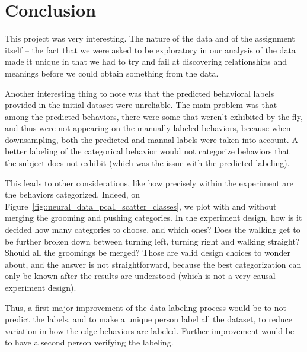 \section{Conclusion}

This project was very interesting.
The nature of the data and of the assignment itself -- the fact that we were asked to be exploratory in our analysis of the data made it unique in that we had to try and fail at discovering relationships and meanings before we could obtain something from the data.

\vspace{\baselineskip}

Another interesting thing to note was that the predicted behavioral labels provided in the initial dataset were unreliable.
The main problem was that among the predicted behaviors, there were some that weren't exhibited by the fly, and thus were not appearing on the manually labeled behaviors, because when downsampling, both the predicted and manual labels were taken into account.
A better labeling of the categorical behavior would not categorize behaviors that the subject does not exhibit (which was the issue with the predicted labeling).

\vspace{\baselineskip}

This leads to other considerations, like how precisely within the experiment are the behaviors categorized.
Indeed, on Figure~\ref{fig::neural_data_pca1_scatter_classes}, we plot with and without merging the grooming and pushing categories.
In the experiment design, how is it decided how many categories to choose, and which ones?
Does the walking get to be further broken down between turning left, turning right and walking straight?
Should all the groomings be merged?
Those are valid design choices to wonder about, and the answer is not straightforward, because the best categorization can only be known after the results are understood (which is not a very causal experiment design).

\vspace{\baselineskip}

Thus, a first major improvement of the data labeling process would be to not predict the labels, and to make a unique person label all the dataset, to reduce variation in how the edge behaviors are labeled.
Further improvement would be to have a second person verifying the labeling.

\vspace{\baselineskip}


